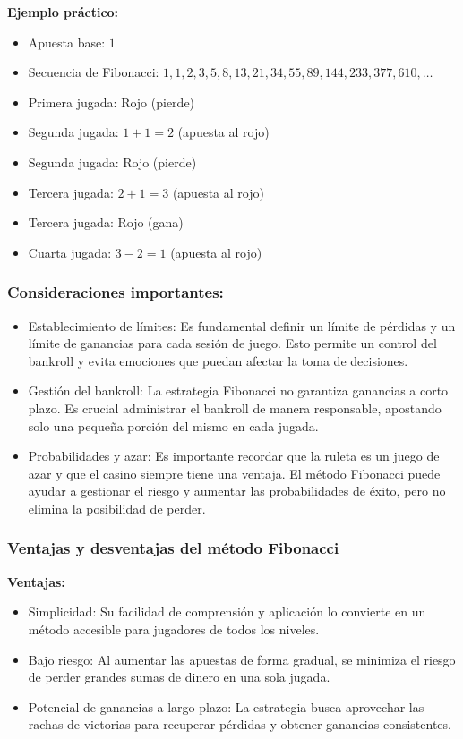 \documentclass{article}
\begin{document}
\textbf{Ejemplo práctico:}

\begin{itemize}
    \item Apuesta base: $1$
    \item Secuencia de Fibonacci: $1, 1, 2, 3, 5, 8, 13, 21, 34, 55, 89, 144, 233, 377, 610, \ldots$
    \item Primera jugada: Rojo (pierde)
    \item Segunda jugada: $1 + 1 = 2$ (apuesta al rojo)
    \item Segunda jugada: Rojo (pierde)
    \item Tercera jugada: $2 + 1 = 3$ (apuesta al rojo)
    \item Tercera jugada: Rojo (gana)
    \item Cuarta jugada: $3 - 2 = 1$ (apuesta al rojo)
\end{itemize}

\subsubsection{Consideraciones importantes:}

\begin{itemize}
    \item Establecimiento de límites: Es fundamental definir un límite de pérdidas y un límite de ganancias para cada sesión de juego. Esto permite un control del bankroll y evita emociones que puedan afectar la toma de decisiones.
    \item Gestión del bankroll: La estrategia Fibonacci no garantiza ganancias a corto plazo. Es crucial administrar el bankroll de manera responsable, apostando solo una pequeña porción del mismo en cada jugada.
    \item Probabilidades y azar: Es importante recordar que la ruleta es un juego de azar y que el casino siempre tiene una ventaja. El método Fibonacci puede ayudar a gestionar el riesgo y aumentar las probabilidades de éxito, pero no elimina la posibilidad de perder.
\end{itemize}

\subsubsection{Ventajas y desventajas del método Fibonacci}

\textbf{Ventajas:}

\begin{itemize}
    \item Simplicidad: Su facilidad de comprensión y aplicación lo convierte en un método accesible para jugadores de todos los niveles.
    \item Bajo riesgo: Al aumentar las apuestas de forma gradual, se minimiza el riesgo de perder grandes sumas de dinero en una sola jugada.
    \item Potencial de ganancias a largo plazo: La estrategia busca aprovechar las rachas de victorias para recuperar pérdidas y obtener ganancias consistentes.
\end{itemize}
\end{document}
